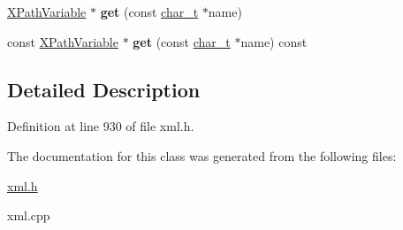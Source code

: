 \begin{DoxyCompactItemize}
\item 
\hypertarget{classphys_1_1xml_1_1XPathVariableSet_a6c7429a3e50c1980a7fcdcee8af66834}{
\hyperlink{classphys_1_1xml_1_1XPathVariable}{XPathVariable} $\ast$ {\bfseries get} (const \hyperlink{namespacephys_1_1xml_afc87705cd1c2917d87b879715a2d8f6e}{char\_\-t} $\ast$name)}
\label{df/dd1/classphys_1_1xml_1_1XPathVariableSet_a6c7429a3e50c1980a7fcdcee8af66834}

\item 
\hypertarget{classphys_1_1xml_1_1XPathVariableSet_a3990eb85bebe88a7d4892eac19d4aa1b}{
const \hyperlink{classphys_1_1xml_1_1XPathVariable}{XPathVariable} $\ast$ {\bfseries get} (const \hyperlink{namespacephys_1_1xml_afc87705cd1c2917d87b879715a2d8f6e}{char\_\-t} $\ast$name) const }
\label{df/dd1/classphys_1_1xml_1_1XPathVariableSet_a3990eb85bebe88a7d4892eac19d4aa1b}

\end{DoxyCompactItemize}


\subsection{Detailed Description}


Definition at line 930 of file xml.h.



The documentation for this class was generated from the following files:\begin{DoxyCompactItemize}
\item 
\hyperlink{xml_8h}{xml.h}\item 
xml.cpp\end{DoxyCompactItemize}
